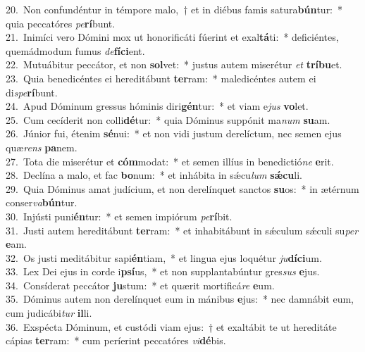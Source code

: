 {20.~}Non confundéntur in témpore malo,~† et in diébus famis satura\textbf{bún}tur:~* quia peccatóres \textit{pe}\textbf{rí}bunt.\\
{21.~}Inimíci vero Dómini mox ut honorificáti fúerint et exal\textbf{tá}ti:~* deficiéntes, quemádmodum fumus \textit{de}\textbf{fí}\textbf{ci}ent.\\
{22.~}Mutuábitur peccátor, et non \textbf{sol}vet:~* justus autem miserétur \textit{et} \textbf{trí}\textbf{bu}et.\\
{23.~}Quia benedicéntes ei hereditábunt \textbf{ter}ram:~* maledicéntes autem ei di\textit{spe}\textbf{rí}bunt.\\
{24.~}Apud Dóminum gressus hóminis diri\textbf{gén}tur:~* et viam e\textit{jus} \textbf{vo}let.\\
{25.~}Cum cecíderit non colli\textbf{dé}tur:~* quia Dóminus suppónit ma\textit{num} \textbf{su}am.\\
{26.~}Júnior fui, étenim \textbf{sé}nui:~* et non vidi justum derelíctum, nec semen ejus quæ\textit{rens} \textbf{pa}nem.\\
{27.~}Tota die miserétur et \textbf{cóm}modat:~* et semen illíus in benedictió\textit{ne} \textbf{e}rit.\\
{28.~}Declína a malo, et fac \textbf{bo}num:~* et inhábita in sǽcu\textit{lum} \textbf{sǽ}\textbf{cu}li.\\
{29.~}Quia Dóminus amat judícium, et non derelínquet sanctos \textbf{su}os:~* in ætérnum conser\textit{va}\textbf{bún}tur.\\
{30.~}Injústi puni\textbf{én}tur:~* et semen impiórum \textit{pe}\textbf{rí}bit.\\
{31.~}Justi autem hereditábunt \textbf{ter}ram:~* et inhabitábunt in sǽculum sǽculi su\textit{per} \textbf{e}am.\\
{32.~}Os justi meditábitur sapi\textbf{én}tiam,~* et lingua ejus loquétur \textit{ju}\textbf{dí}\textbf{ci}um.\\
{33.~}Lex Dei ejus in corde i\textbf{psí}us,~* et non supplantabúntur gres\textit{sus} \textbf{e}jus.\\
{34.~}Consíderat peccátor \textbf{ju}stum:~* et quærit mortificá\textit{re} \textbf{e}um.\\
{35.~}Dóminus autem non derelínquet eum in mánibus \textbf{e}jus:~* nec damnábit eum, cum judicábi\textit{tur} \textbf{il}li.\\
{36.~}Exspécta Dóminum, et custódi viam ejus:~† et exaltábit te ut hereditáte cápias \textbf{ter}ram:~* cum períerint peccatóres \textit{vi}\textbf{dé}bis.\\

